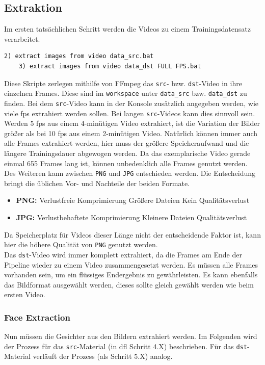 \subsection{Extraktion}\label{subsec:extraction}
Im ersten tatsächlichen Schritt werden die Videos zu einem Trainingsdatensatz verarbeitet.
\begin{lstlisting}[label={lst:extraction-1},numbers=none]
    2) extract images from video data_src.bat
    3) extract images from video data_dst FULL FPS.bat
\end{lstlisting}
Diese Skripte zerlegen mithilfe von FFmpeg das \texttt{src}- bzw. \texttt{dst}-Video in ihre einzelnen Frames.
Diese sind im \texttt{workspace} unter \texttt{data\_src} bzw. \texttt{data\_dst} zu finden.
Bei dem \texttt{src}-Video kann in der Konsole zusätzlich angegeben werden, wie viele \gls{fps} extrahiert werden sollen.
Bei langen \texttt{src}-Videos kann dies sinnvoll sein.
Werden 5 \gls{fps} aus einem 4-minütigen Video extrahiert, ist die Variation der Bilder größer als bei 10 \gls{fps} aus einem 2-minütigen Video.
Natürlich können immer auch alle Frames extrahiert werden, hier muss der größere Speicheraufwand und die längere Trainingsdauer abgewogen werden.
Da das exemplarische Video gerade einmal 655 Frames lang ist, können unbedenklich alle Frames genutzt werden.
Des Weiteren kann zwischen \texttt{PNG} und \texttt{JPG} entschieden werden.
Die Entscheidung bringt die üblichen Vor- und Nachteile der beiden Formate.
\begin{itemize}
    \item \textbf{PNG:} Verlustfreie Komprimierung \rightarrow Größere Dateien \rightarrow Kein Qualitätsverlust
    \item \textbf{JPG:} Verlustbehaftete Komprimierung \rightarrow Kleinere Dateien \rightarrow Qualitätsverlust
\end{itemize}
Da Speicherplatz für Videos dieser Länge nicht der entscheidende Faktor ist, kann hier die höhere Qualität von \texttt{PNG} genutzt werden.\\
Das \texttt{dst}-Video wird immer komplett extrahiert, da die Frames am Ende der Pipeline wieder zu einem Video zusammengesetzt werden.
Es müssen alle Frames vorhanden sein, um ein flüssiges Endergebnis zu gewährleisten.
Es kann ebenfalls das Bildformat ausgewählt werden, dieses sollte gleich gewählt werden wie beim ersten Video.

\subsubsection*{Face Extraction}
Nun müssen die Gesichter aus den Bildern extrahiert werden.
Im Folgenden wird der Prozess für das \texttt{src}-Material (in \gls{dfl} Schritt 4.X) beschrieben.
Für das \texttt{dst}-Material verläuft der Prozess (als Schritt 5.X) analog.

